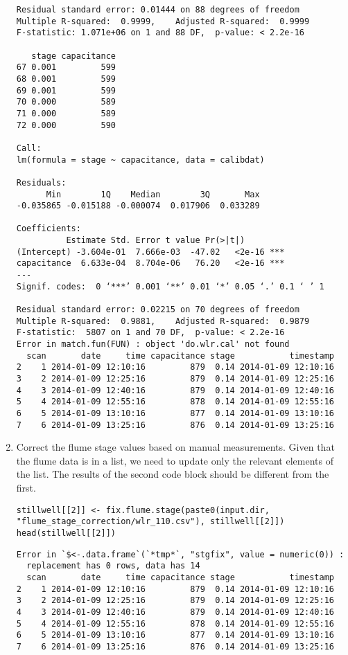 \documentclass[a4paper]{article}
\begin{document}
\begin{enumerate}
\begin{verbatim}
Residual standard error: 0.01444 on 88 degrees of freedom
Multiple R-squared:  0.9999,	Adjusted R-squared:  0.9999 
F-statistic: 1.071e+06 on 1 and 88 DF,  p-value: < 2.2e-16

   stage capacitance
67 0.001         599
68 0.001         599
69 0.001         599
70 0.000         589
71 0.000         589
72 0.000         590

Call:
lm(formula = stage ~ capacitance, data = calibdat)

Residuals:
      Min        1Q    Median        3Q       Max 
-0.035865 -0.015188 -0.000074  0.017906  0.033289 

Coefficients:
	      Estimate Std. Error t value Pr(>|t|)    
(Intercept) -3.604e-01  7.666e-03  -47.02   <2e-16 ***
capacitance  6.633e-04  8.704e-06   76.20   <2e-16 ***
---
Signif. codes:  0 ‘***’ 0.001 ‘**’ 0.01 ‘*’ 0.05 ‘.’ 0.1 ‘ ’ 1

Residual standard error: 0.02215 on 70 degrees of freedom
Multiple R-squared:  0.9881,	Adjusted R-squared:  0.9879 
F-statistic:  5807 on 1 and 70 DF,  p-value: < 2.2e-16
Error in match.fun(FUN) : object 'do.wlr.cal' not found
  scan       date     time capacitance stage           timestamp
2    1 2014-01-09 12:10:16         879  0.14 2014-01-09 12:10:16
3    2 2014-01-09 12:25:16         879  0.14 2014-01-09 12:25:16
4    3 2014-01-09 12:40:16         879  0.14 2014-01-09 12:40:16
5    4 2014-01-09 12:55:16         878  0.14 2014-01-09 12:55:16
6    5 2014-01-09 13:10:16         877  0.14 2014-01-09 13:10:16
7    6 2014-01-09 13:25:16         876  0.14 2014-01-09 13:25:16
\end{verbatim}

\item Correct the flume stage values based on manual measurements. Given that the flume data is in a list, we need to update only the relevant elements of the list. The results of the second code block should be different from the first.

\begin{verbatim}
stillwell[[2]] <- fix.flume.stage(paste0(input.dir, "flume_stage_correction/wlr_110.csv"), stillwell[[2]])
head(stillwell[[2]])
\end{verbatim}

\begin{verbatim}
Error in `$<-.data.frame`(`*tmp*`, "stgfix", value = numeric(0)) : 
  replacement has 0 rows, data has 14
  scan       date     time capacitance stage           timestamp
2    1 2014-01-09 12:10:16         879  0.14 2014-01-09 12:10:16
3    2 2014-01-09 12:25:16         879  0.14 2014-01-09 12:25:16
4    3 2014-01-09 12:40:16         879  0.14 2014-01-09 12:40:16
5    4 2014-01-09 12:55:16         878  0.14 2014-01-09 12:55:16
6    5 2014-01-09 13:10:16         877  0.14 2014-01-09 13:10:16
7    6 2014-01-09 13:25:16         876  0.14 2014-01-09 13:25:16
\end{verbatim}
\end{enumerate}
\end{document}
